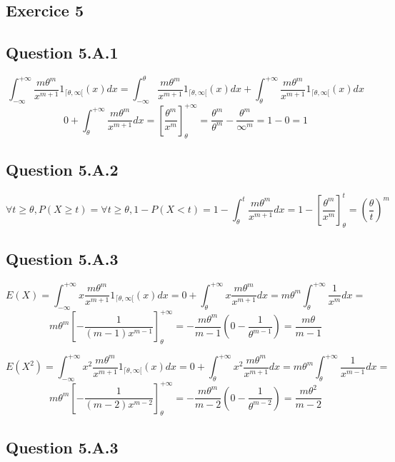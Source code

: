 \documentclass[]{book}
\theoremstyle{definition}
\begin{document}
\subsection*{Exercice 5}
\subsection*{Question 5.A.1}

$$
\int_{-\infty}^{+\infty}{\frac{m \theta^m}{x^{m+1}}1_{\lceil \theta, \infty[}(x) dx} = 
\int_{-\infty}^{\theta}{\frac{m \theta^m}{x^{m+1}}1_{\lceil \theta, \infty[}(x) dx} + \int_{\theta}^{+\infty}{\frac{m \theta^m}{x^{m+1}}1_{\lceil \theta, \infty[}(x) dx}
$$
$$
0 + \int_{\theta}^{+\infty}{\frac{m \theta^m}{x^{m+1}} dx} =
\left[\frac{\theta^m}{x^m}\right]_{\theta}^{+\infty} =
\frac{\theta^m}{\theta^m} - \frac{\theta^m}{\infty^m} = 1 - 0 = 1
$$

\subsection*{Question 5.A.2}
$$
\forall t \geq \theta, P(X \geq t) = \forall t \geq \theta, 1 - P(X < t) = 1- \int_{\theta}^{t}{\frac{m \theta^m}{x^{m+1}} dx} = 1 - \left[\frac{\theta^m}{x^m}\right]_{\theta}^{t} = \left( \frac{\theta}{t}\right)^m
$$


\subsection*{Question 5.A.3}
$$
E(X) = \int_{-\infty}^{+\infty}{x \frac{m \theta^m}{x^{m+1}}1_{\lceil \theta, \infty[}(x) dx} =
0 + \int_{\theta}^{+\infty}{x\frac{m \theta^m}{x^{m+1}} dx} =
m \theta^m \int_{\theta}^{+\infty}{\frac{1}{x^{m}} dx} = 
$$
$$
m \theta^m \left[-\frac{1}{(m-1)x^{m-1}}\right]_{\theta}^{+\infty} = 
-\frac{m \theta^m}{m-1} \left(0 - \frac{1}{\theta^{m-1}}\right) =
\frac{m \theta}{m-1}
$$

\bigskip

$$
E(X^2) = \int_{-\infty}^{+\infty}{x^2 \frac{m \theta^m}{x^{m+1}}1_{\lceil \theta, \infty[}(x) dx} =
0 + \int_{\theta}^{+\infty}{x^2\frac{m \theta^m}{x^{m+1}} dx} =
m \theta^m \int_{\theta}^{+\infty}{\frac{1}{x^{m-1}} dx} = 
$$
$$
m \theta^m \left[-\frac{1}{(m-2)x^{m-2}}\right]_{\theta}^{+\infty} = 
-\frac{m \theta^m}{m-2} \left(0 - \frac{1}{\theta^{m-2}}\right) =
\frac{m \theta^2}{m-2}
$$

\subsection*{Question 5.A.3}
\end{document}
